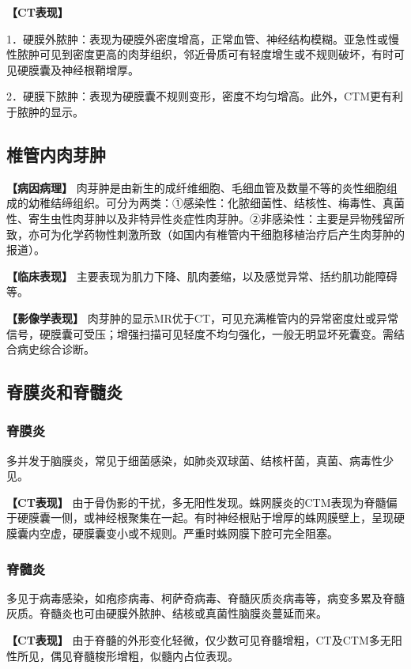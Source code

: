 \textbf{【CT表现】}

1．硬膜外脓肿：表现为硬膜外密度增高，正常血管、神经结构模糊。亚急性或慢性脓肿可见到密度更高的肉芽组织，邻近骨质可有轻度增生或不规则破坏，有时可见硬膜囊及神经根鞘增厚。

2．硬膜下脓肿：表现为硬膜囊不规则变形，密度不均匀增高。此外，CTM更有利于脓肿的显示。

\subsection{椎管内肉芽肿}

\textbf{【病因病理】}
肉芽肿是由新生的成纤维细胞、毛细血管及数量不等的炎性细胞组成的幼稚结缔组织。可分为两类：①感染性：化脓细菌性、结核性、梅毒性、真菌性、寄生虫性肉芽肿以及非特异性炎症性肉芽肿。②非感染性：主要是异物残留所致，亦可为化学药物性刺激所致（如国内有椎管内干细胞移植治疗后产生肉芽肿的报道）。

\textbf{【临床表现】}
主要表现为肌力下降、肌肉萎缩，以及感觉异常、括约肌功能障碍等。

\textbf{【影像学表现】}
肉芽肿的显示MR优于CT，可见充满椎管内的异常密度灶或异常信号，硬膜囊可受压；增强扫描可见轻度不均匀强化，一般无明显坏死囊变。需结合病史综合诊断。

\subsection{脊膜炎和脊髓炎}

\subsubsection{脊膜炎}

多并发于脑膜炎，常见于细菌感染，如肺炎双球菌、结核杆菌，真菌、病毒性少见。

\textbf{【CT表现】}
由于骨伪影的干扰，多无阳性发现。蛛网膜炎的CTM表现为脊髓偏于硬膜囊一侧，或神经根聚集在一起。有时神经根贴于增厚的蛛网膜壁上，呈现硬膜囊内空虚，硬膜囊变小或不规则。严重时蛛网膜下腔可完全阻塞。

\subsubsection{脊髓炎}

多见于病毒感染，如疱疹病毒、柯萨奇病毒、脊髓灰质炎病毒等，病变多累及脊髓灰质。脊髓炎也可由硬膜外脓肿、结核或真菌性脑膜炎蔓延而来。

\textbf{【CT表现】}
由于脊髓的外形变化轻微，仅少数可见脊髓增粗，CT及CTM多无阳性所见，偶见脊髓梭形增粗，似髓内占位表现。

